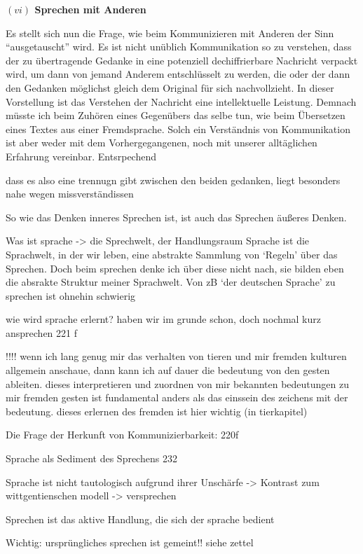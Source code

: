 \documentclass[a4paper, 12pt]{article}
\begin{document}
\begin{onehalfspace}
\noindent\textbf{$(vi)$ Sprechen mit Anderen}

\noindent Es stellt sich nun die Frage, wie beim Kommunizieren mit Anderen der Sinn "`ausgetauscht"' wird. Es ist nicht unüblich Kommunikation so zu verstehen, dass der zu übertragende Gedanke in eine potenziell dechiffrierbare Nachricht verpackt wird, um dann von jemand Anderem entschlüsselt zu werden, die oder der dann den Gedanken möglichst gleich dem Original für sich nachvollzieht. In dieser Vorstellung ist das Verstehen der Nachricht eine intellektuelle Leistung. Demnach müsste ich beim Zuhören eines Gegenübers das selbe tun, wie beim Übersetzen eines Textes aus einer Fremdsprache. Solch ein Verständnis von Kommunikation ist aber weder mit dem Vorhergegangenen, noch mit unserer alltäglichen Erfahrung vereinbar. Entsrpechend 

dass es also eine trennugn gibt zwischen den beiden gedanken, liegt besonders nahe wegen missverständissen

So wie das Denken inneres Sprechen ist, ist auch das Sprechen äußeres Denken. 



Was ist sprache -> die Sprechwelt, der Handlungsraum
Sprache ist die Sprachwelt, in der wir leben, eine abstrakte Sammlung von ‘Regeln’ über das Sprechen. Doch beim sprechen denke ich über diese nicht nach, sie bilden eben die absrakte Struktur meiner Sprachwelt. Von zB ‘der deutschen Sprache’ zu sprechen ist ohnehin schwierig

wie wird sprache erlernt? haben wir im grunde schon, doch nochmal kurz ansprechen 221 f

!!!! wenn ich lang genug mir das verhalten von tieren und mir fremden kulturen allgemein anschaue, dann kann ich auf dauer die bedeutung von den gesten ableiten. dieses interpretieren und zuordnen von mir bekannten bedeutungen zu mir fremden gesten ist fundamental anders als das einssein des zeichens mit der bedeutung. dieses erlernen des fremden ist hier wichtig (in tierkapitel)
	

Die Frage der Herkunft von Kommunizierbarkeit: 220f

Sprache als Sediment des Sprechens 232

Sprache ist nicht tautologisch aufgrund ihrer Unschärfe
-> Kontrast zum wittgentienschen modell
-> versprechen

Sprechen ist das aktive Handlung, die sich der sprache bedient

Wichtig: ursprüngliches sprechen ist gemeint!! siehe zettel


\end{onehalfspace}
\end{document}
